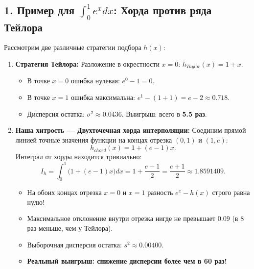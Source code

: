 \documentclass[11pt,a4paper]{article}
\begin{document}
\subsection{1. Пример для $\int_0^1 e^x dx$: Хорда против ряда Тейлора}
Рассмотрим две различные стратегии подбора $h(x)$:
\begin{enumerate}
    \item \textbf{Стратегия Тейлора:} Разложение в окрестности $x = 0$: $h_{Taylor}(x) = 1 + x$.
    \begin{itemize}
        \item В точке $x = 0$ ошибка нулевая: $e^0 - 1 = 0$.
        \item В точке $x = 1$ ошибка максимальна: $e^1 - (1 + 1) = e - 2 \approx 0.718$.
        \item Дисперсия остатка: $\sigma^2 \approx 0.0436$. Выигрыш: всего в \textbf{5.5 раз}.
    \end{itemize}
    
    \item \textbf{Наша хитрость --- Двухточечная хорда интерполяции:}
    Соединим прямой линией точные значения функции на концах отрезка $(0, 1)$ и $(1, e)$:
    \begin{equation}
        h_{chord}(x) = 1 + (e - 1)x.
    \end{equation}
    Интеграл от хорды находится тривиально:
    \begin{equation}
        I_h = \int_0^1 \big(1 + (e - 1)x\big) dx = 1 + \frac{e - 1}{2} = \frac{e + 1}{2} \approx 1.8591409.
    \end{equation}
    \begin{itemize}
        \item На обоих концах отрезка $x=0$ и $x=1$ разность $e^x - h(x)$ строго равна нулю!
        \item Максимальное отклонение внутри отрезка нигде не превышает $0.09$ (в 8 раз меньше, чем у Тейлора).
        \item Выборочная дисперсия остатка: $s^2 \approx 0.00400$.
        \item \textbf{Реальный выигрыш: снижение дисперсии более чем в 60 раз!}
    \end{itemize}
\end{enumerate}
\end{document}
